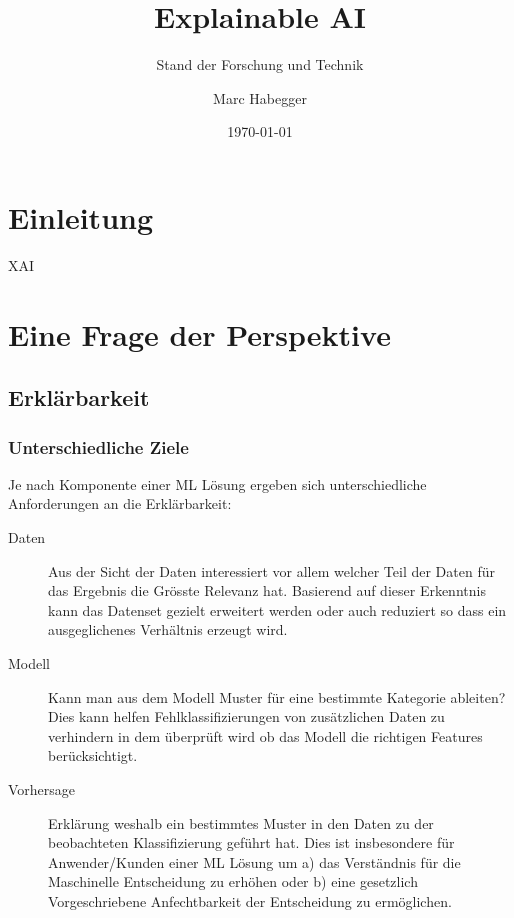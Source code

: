 \documentclass[
  12pt, %
  a4paper, %
  oneside, %
  openany, 
  numbers=noenddot, %
  BCOR=5mm, %
  parskip=half*, %
  thesis, %
]{bfhbook}
\author{Marc Habegger}
\title{Explainable AI}
\subtitle{Stand der Forschung und Technik}
\date{\today} %
\begin{document}
                         
\maketitle

\tableofcontents
\sloppy
\mainmatter %

\chapter{Einleitung}
\Gls{XAI}
\chapter{Eine Frage der Perspektive}
\section{Erklärbarkeit}
\subsection{Unterschiedliche Ziele}
Je nach Komponente einer ML Lösung ergeben sich unterschiedliche Anforderungen an die Erklärbarkeit: \parencite{XAI2018}

\begin{description}
\item[Daten]
Aus der Sicht der Daten interessiert vor allem welcher Teil der Daten für das Ergebnis die Grösste Relevanz hat. Basierend auf dieser Erkenntnis kann das Datenset gezielt erweitert werden oder auch reduziert so dass ein ausgeglichenes Verhältnis erzeugt wird.

\item[Modell]
Kann man aus dem Modell Muster für eine bestimmte Kategorie ableiten? Dies kann helfen Fehlklassifizierungen von zusätzlichen Daten zu verhindern in dem überprüft wird ob das Modell die richtigen Features berücksichtigt.

\item[Vorhersage]
Erklärung weshalb ein bestimmtes Muster in den Daten zu der beobachteten Klassifizierung geführt hat. Dies ist insbesondere für Anwender/Kunden einer ML Lösung um a) das Verständnis für die Maschinelle Entscheidung zu erhöhen oder b) eine gesetzlich Vorgeschriebene Anfechtbarkeit der Entscheidung zu ermöglichen.
\end{description}
\end{document}
